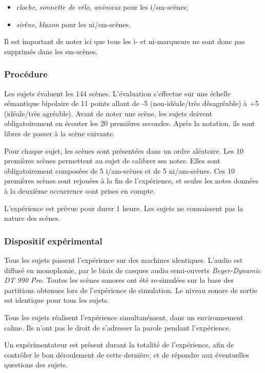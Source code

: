 \documentclass[twoside,twocolumn]{article}
\begin{document}
\begin{itemize}
\item \emph{cloche}, \emph{sonnette de vélo}, \emph{animaux} pour les i/sm-scènes;
\item \emph{sirène}, \emph{klaxon} pour les ni/sm-scènes.
\end{itemize}

Il est important de noter ici que tous les i- et ni-marqueurs ne sont donc pas supprimés dans les sm-scènes.

\subsubsection*{Procédure}

Les sujets évaluent les 144 scènes. L'évaluation s'effectue sur une échelle sémantique bipolaire de 11 points allant de -5 (non-idéale/très désagréable) à +5 (idéale/très agréable). Avant de noter une scène, les sujets doivent obligatoirement en écouter les 20 premières secondes. Après la notation, ils sont libres de passer à la scène suivante.

Pour chaque sujet, les scènes sont présentées dans un ordre aléatoire. Les 10 premières scènes permettent au sujet de calibrer ses notes. Elles sont obligatoirement composées de 5 i/am-scènes et de 5 ni/am-scènes. Ces 10 premières scènes sont rejouées à la fin de l'expérience, et seules les notes données à la deuxième occurrence sont prises en compte.

L'expérience est prévue pour durer 1 heure. Les sujets ne connaissent pas la nature des scènes.

\subsubsection*{Dispositif expérimental}

Tous les sujets passent l'expérience sur des machines identiques. L'audio est diffusé en monophonie, par le biais de casques audio semi-ouverts \emph{Beyer-Dynamic DT 990 Pro}. Toutes les scènes sonores ont été re-simulées sur la base des partitions obtenues lors de l'expérience de simulation. Le niveau sonore de sortie est identique pour tous les sujets.

Tous les sujets réalisent l'expérience simultanément, dans un environnement calme. Ils n'ont pas le droit de s'adresser la parole pendant l'expérience.

Un expérimentateur est présent durant la totalité de l'expérience, afin de contrôler le bon déroulement de cette dernière, et de répondre aux éventuelles questions des sujets.
\end{document}
